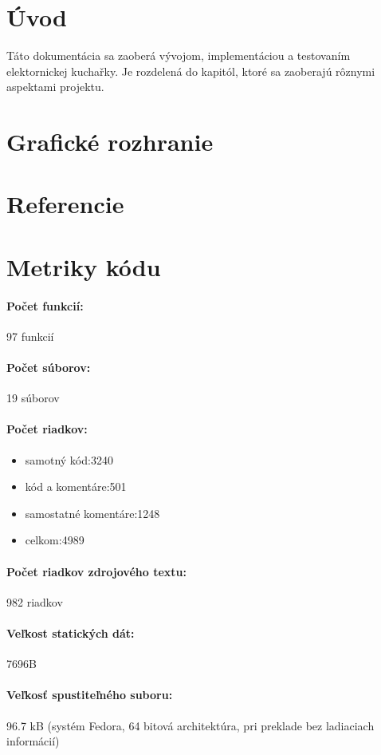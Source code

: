 \documentclass[12pt,a4paper,titlepage,final]{article}
\begin{document}


\tableofcontents
\newpage

\section{Úvod}
Táto dokumentácia sa zaoberá vývojom, implementáciou a testovaním elektornickej kuchařky. Je rozdelená do kapitól, ktoré sa zaoberajú rôznymi aspektami projektu.

\section{Grafické rozhranie}


\section{Referencie}





\newpage
\section{Metriky kódu}

\paragraph{Počet funkcií:} 97 funkcií
\paragraph{Počet súborov:} 19 súborov
\paragraph{Počet riadkov:}
\begin{itemize}
\item	  samotný kód:3240
\item	  kód a komentáre:501
\item	  samostatné komentáre:1248
\item	  celkom:4989
\end{itemize}
\paragraph{Počet riadkov zdrojového textu:} 982  riadkov
\paragraph{Veľkost statických dát:} 7696B
\paragraph{Veľkosť spustiteľného suboru:} 96.7 kB (systém Fedora, 64 bitová
architektúra, pri preklade bez ladiaciach informácií)

\newpage 
\end{document}
